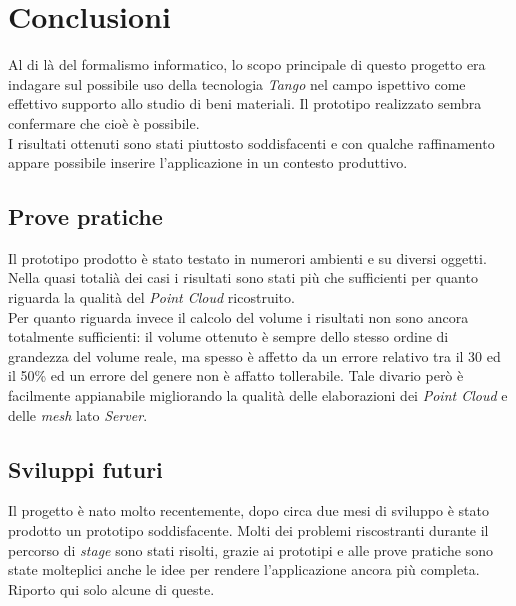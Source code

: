 
\chapter{Conclusioni}
\label{cap:conclusioni}
Al di là del formalismo informatico, lo scopo principale di questo progetto era indagare sul possibile uso della tecnologia \emph{Tango} nel campo ispettivo come effettivo supporto allo studio di beni materiali. Il prototipo realizzato sembra confermare che cioè è possibile.\\
I risultati ottenuti sono stati piuttosto soddisfacenti e con qualche raffinamento appare possibile inserire l'applicazione in un contesto produttivo.

\section{Prove pratiche}
Il prototipo prodotto è stato testato in numerori ambienti e su diversi oggetti. Nella quasi totalià dei casi i risultati sono stati più che sufficienti per quanto riguarda la qualità del \emph{Point Cloud} ricostruito.\\
Per quanto riguarda invece il calcolo del volume i risultati non sono ancora totalmente sufficienti: il volume ottenuto è sempre dello stesso ordine di grandezza del volume reale, ma spesso è affetto da un errore relativo tra il 30 ed il 50\% ed un errore del genere non è affatto tollerabile. Tale divario però è facilmente appianabile migliorando la qualità delle elaborazioni dei \emph{Point Cloud} e delle \emph{mesh} lato \emph{Server}.

\section{Sviluppi futuri}
Il progetto è nato molto recentemente, dopo circa due mesi di sviluppo è stato prodotto un prototipo soddisfacente. Molti dei problemi riscostranti durante il percorso di \emph{stage} sono stati risolti, grazie ai prototipi e alle prove pratiche sono state molteplici anche le idee per rendere l'applicazione ancora più completa. Riporto qui solo alcune di queste.

